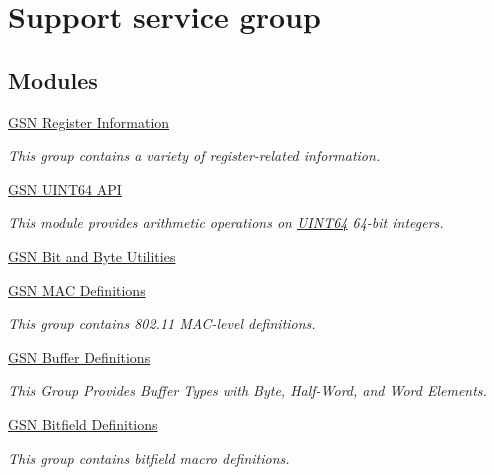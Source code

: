 \hypertarget{a00684}{
\section{Support service group}
\label{a00684}
}
\subsection*{Modules}
\begin{DoxyCompactItemize}
\item 
\hyperlink{a00629}{GSN Register Information}


\begin{DoxyCompactList}\small\item\em This group contains a variety of register-\/related information. \end{DoxyCompactList}

\item 
\hyperlink{a00633}{GSN UINT64 API}


\begin{DoxyCompactList}\small\item\em This module provides arithmetic operations on \hyperlink{a00462}{UINT64} 64-\/bit integers. \end{DoxyCompactList}

\item 
\hyperlink{a00634}{GSN Bit and Byte Utilities}
\item 
\hyperlink{a00642}{GSN MAC Definitions}


\begin{DoxyCompactList}\small\item\em This group contains 802.11 MAC-\/level definitions. \end{DoxyCompactList}

\item 
\hyperlink{a00654}{GSN Buffer Definitions}


\begin{DoxyCompactList}\small\item\em This Group Provides Buffer Types with Byte, Half-\/Word, and Word Elements. \end{DoxyCompactList}

\item 
\hyperlink{a00657}{GSN Bitfield Definitions}


\begin{DoxyCompactList}\small\item\em This group contains bitfield macro definitions. \end{DoxyCompactList}


\end{DoxyCompactItemize}
